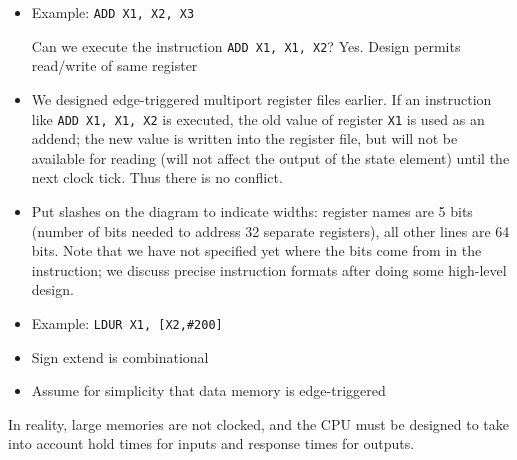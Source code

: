 \begin{frame}[fragile]
\begin{itemize}
\item Example: {\tt ADD X1, X2, X3}


 
 \begin{tcolorbox}[enhanced,attach boxed title to top center={yshift=-3mm,yshifttext=-1mm},
  colback=blue!5!white,colframe=blue!75!black,colbacktitle=blue!80!black,
  title=Think About It,fonttitle=\bfseries,
  boxed title style={size=small,colframe=red!50!black} ]
  Can we execute the instruction \texttt{ADD X1, X1, X2}?
  {\small{\color{red}Yes. Design permits read/write of same register}}
\end{tcolorbox}
\end{itemize}
\BNotes\ifnum{}
\begin{itemize}
\item
We designed edge-triggered multiport register files earlier. If an
instruction like {\tt ADD X1, X1, X2} is executed, the old value
of register {\tt X1} is used as an addend; the new value is written
into the register file, but will not be available for reading (will
not affect the output of the state element) until the next clock
tick. Thus there is no conflict.
\item
Put slashes on the diagram to indicate widths: register names are 5
bits (number of bits needed to address 32 separate registers), all
other lines are 64 bits. Note that we have not specified yet where the
bits come from in the instruction; we discuss precise instruction
formats after doing some high-level design.
\end{itemize}
\fi\ENotes
\end{frame}

\begin{frame}[fragile]
\begin{itemize}
\item Example: {\tt LDUR X1, [X2,\#200]}

\item Sign extend is combinational 
\item Assume for simplicity that data memory is edge-triggered
\end{itemize}
\BNotes\ifnum{}
In reality, large memories are not clocked, and the CPU must be
designed to take into account hold times for inputs and response times
for outputs.
\fi\ENotes
\end{frame}


